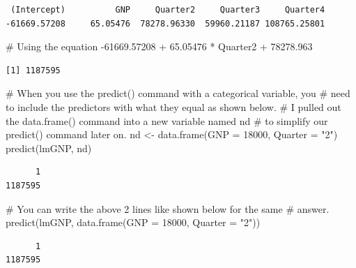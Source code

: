\documentclass[
  letterpaper,
  DIV=11,
  numbers=noendperiod]{scrreprt}
\newenvironment{Shaded}{\begin{snugshade}}{\end{snugshade}}
\newcommand{\AttributeTok}[1]{\textcolor[rgb]{0.40,0.45,0.13}{#1}}
\newcommand{\CommentTok}[1]{\textcolor[rgb]{0.37,0.37,0.37}{#1}}
\newcommand{\DecValTok}[1]{\textcolor[rgb]{0.68,0.00,0.00}{#1}}
\newcommand{\FloatTok}[1]{\textcolor[rgb]{0.68,0.00,0.00}{#1}}
\newcommand{\FunctionTok}[1]{\textcolor[rgb]{0.28,0.35,0.67}{#1}}
\newcommand{\NormalTok}[1]{\textcolor[rgb]{0.00,0.23,0.31}{#1}}
\newcommand{\OtherTok}[1]{\textcolor[rgb]{0.00,0.23,0.31}{#1}}
\newcommand{\SpecialCharTok}[1]{\textcolor[rgb]{0.37,0.37,0.37}{#1}}
\newcommand{\StringTok}[1]{\textcolor[rgb]{0.13,0.47,0.30}{#1}}
\begin{document}
\begin{verbatim}
 (Intercept)          GNP     Quarter2     Quarter3     Quarter4 
-61669.57208     65.05476  78278.96330  59960.21187 108765.25801 
\end{verbatim}

\begin{Shaded}
\begin{Highlighting}[]
\CommentTok{\# Using the equation}
\SpecialCharTok{{-}}\FloatTok{61669.57208} \SpecialCharTok{+} \FloatTok{65.05476} \SpecialCharTok{*}\NormalTok{ Quarter2 }\SpecialCharTok{+} \FloatTok{78278.963}
\end{Highlighting}
\end{Shaded}

\begin{verbatim}
[1] 1187595
\end{verbatim}

\begin{Shaded}
\begin{Highlighting}[]
\CommentTok{\# When you use the predict() command with a categorical variable, you}
\CommentTok{\# need to include the predictors with what they equal as shown below.}
\CommentTok{\# I pulled out the data.frame() command into a new variable named nd}
\CommentTok{\# to simplify our predict() command later on.}
\NormalTok{nd }\OtherTok{\textless{}{-}} \FunctionTok{data.frame}\NormalTok{(}\AttributeTok{GNP =} \DecValTok{18000}\NormalTok{, }\AttributeTok{Quarter =} \StringTok{"2"}\NormalTok{)}
\FunctionTok{predict}\NormalTok{(lmGNP, nd)}
\end{Highlighting}
\end{Shaded}

\begin{verbatim}
      1 
1187595 
\end{verbatim}

\begin{Shaded}
\begin{Highlighting}[]
\CommentTok{\# You can write the above 2 lines like shown below for the same}
\CommentTok{\# answer.}
\FunctionTok{predict}\NormalTok{(lmGNP, }\FunctionTok{data.frame}\NormalTok{(}\AttributeTok{GNP =} \DecValTok{18000}\NormalTok{, }\AttributeTok{Quarter =} \StringTok{"2"}\NormalTok{))}
\end{Highlighting}
\end{Shaded}

\begin{verbatim}
      1 
1187595 
\end{verbatim}
\end{document}
